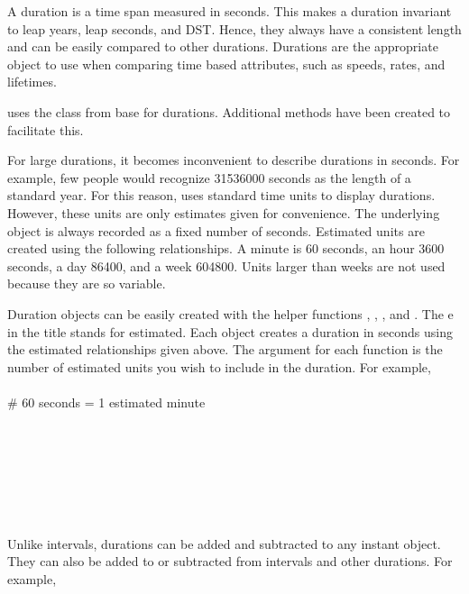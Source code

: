 \documentclass[article]{jss}
\begin{document}
A duration is a time span measured in seconds. This makes a duration invariant to leap years, leap seconds, and DST. Hence, they always have a consistent length and can be easily compared to other durations. Durations are the appropriate object to use when comparing time based attributes, such as speeds, rates, and lifetimes.

 uses the  class from base  for durations. Additional  methods have been created to facilitate this. 

For large durations, it becomes inconvenient to describe durations in seconds. For example, few people would recognize 31536000 seconds as the length of a standard year. For this reason,  uses standard time units to display durations. However, these units are only estimates given for convenience. The underlying object is always recorded as a fixed number of seconds. Estimated units are created using the following relationships. A minute is 60 seconds, an hour 3600 seconds, a day 86400, and a week 604800. Units larger than weeks are not used because they are so variable.

Duration objects can be easily created with the helper functions 
, , , and  . The e in the title stands for estimated. Each object creates a duration in seconds using the estimated relationships given above. The argument for each function is the number of estimated units you wish to include in the duration. For example,\\

\\
 \# 60 seconds = 1 estimated minute\\

\\
\\

\\
\\

\\
\\
\\

Unlike intervals, durations can be added and subtracted to any instant object. They can also be added to or subtracted from intervals and other durations. For example,\\
\end{document}

